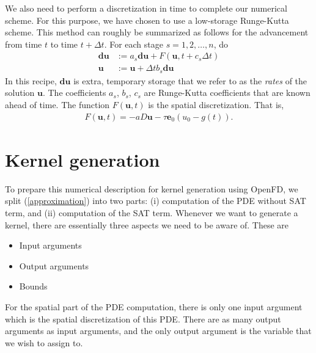 \documentclass[a4paper]{article}
\newcommand{\ub}{\mathbf{u}}
\newcommand{\eb}{\mathbf{e}}
\newcommand{\dub}{\mathbf{du}}
\begin{document}
We also need to perform a discretization in time to complete our numerical
scheme. For this purpose, we have chosen to use a low-storage Runge-Kutta
scheme. This method can roughly be summarized as follows for the advancement
from time $t$ to time $t + \Delta t $. For each stage
$s=1,2,\ldots, n$, do
\begin{align}
        \dub &:= a_s\dub + F(\ub, t + c_s\Delta t) \\
        \ub &:= \ub + \Delta t b_s \dub
\end{align}
In this recipe, $\dub$ is extra, temporary storage that we refer to as the
\emph{rates} of the solution $\ub$. The coefficients $a_s$, $b_s$, $c_s$ are
Runge-Kutta coefficients that are known ahead of time. The function $F(\ub, t)$
is the spatial discretization. That is,
\begin{align}
        F(\ub, t) = -aD\ub -\tau\eb_0(u_0 - g(t)).
\end{align}

\section{Kernel generation}
To prepare this numerical description for kernel generation using OpenFD, we split
(\ref{approximation}) into two parts: (i) computation of the PDE without SAT term,
and (ii) computation of the SAT term. Whenever we want to generate a kernel,
there are essentially three aspects we need to be aware of. These are
\begin{itemize}
        \item Input arguments
        \item Output arguments
        \item Bounds
\end{itemize}
For the spatial part of the PDE
computation, there is only one input argument which is the spatial
discretization of this PDE. There are as many output arguments as input
arguments, and the only output argument is the variable that we wish to assign
to. 
\end{document}

